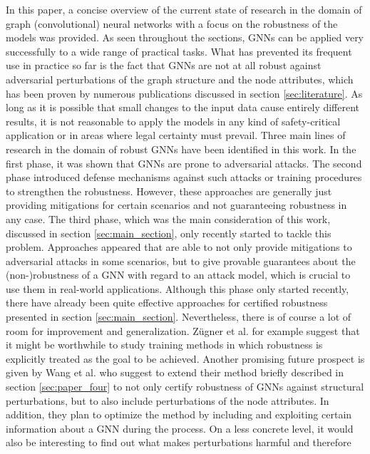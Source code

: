 \documentclass[a4paper,preprint]{sig-alternate}
\begin{document}
In this paper, a concise overview of the current state of research in the domain of graph (convolutional) neural networks with a focus on the robustness 
of the models was provided. As seen throughout the sections, GNNs can be applied very successfully to a wide range of practical tasks.
What has prevented its frequent use in practice so far is the fact that GNNs are not at all robust against adversarial perturbations of the graph structure
and the node attributes, which has been proven by numerous publications discussed in section \ref{sec:literature}.
As long as it is possible that small changes to the input data cause entirely different results, it is not reasonable to
apply the models in any kind of safety-critical application or in areas where legal certainty must prevail.\newline
Three main lines of research in the domain of robust GNNs have been identified in this work. In the first phase, it was shown that GNNs are prone to adversarial attacks.
The second phase introduced defense mechanisms against such attacks or training procedures to strengthen the robustness. However, these approaches
are generally just providing mitigations for certain scenarios and not guaranteeing robustness in any case.
The third phase, which was the main consideration of this work, discussed in section \ref{sec:main_section}, only recently started to tackle this problem. 
Approaches appeared that are able to not only provide mitigations to adversarial attacks in some scenarios, but to give provable guarantees about 
the (non-)robustness of a GNN with regard to an attack model, which is crucial to use them in real-world applications.\newline
Although this phase only started recently, there have already been quite effective approaches for certified robustness presented in section \ref{sec:main_section}.
Nevertheless, there is of course a lot of room for improvement and generalization.
Zügner et al. \cite{10.1145/3394486.3403217} for example suggest that it might be worthwhile to study training methods in which 
robustness is explicitly treated as the goal to be achieved.
Another promising future prospect is given by Wang et al. \cite{Wang_2020} who suggest to extend their method briefly described in 
section \ref{sec:paper_four} to not only certify robustness of GNNs against structural perturbations, but to also include perturbations
of the node attributes.
In addition, they plan to optimize the method by including and exploiting certain information about a GNN during the process.
On a less concrete level, it would also be interesting to find out what makes perturbations harmful and therefore
\end{document}
